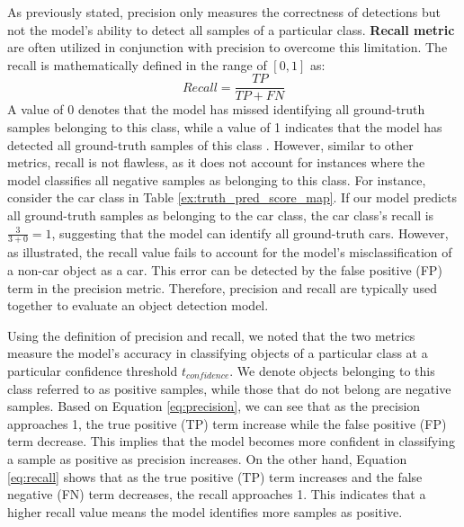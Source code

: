 As previously stated, precision only measures the correctness of detections but not the model's ability to detect all samples of a particular class. \textbf{Recall metric} are often utilized in conjunction with precision to overcome this limitation. The recall is mathematically defined in the range of $[0,1]$ as:
\begin{equation}
    Recall = \frac{TP}{TP+FN} \label{eq:recall}
\end{equation}
A value of 0 denotes that the model has missed identifying all ground-truth samples belonging to this class, while a value of 1 indicates that the model has detected all ground-truth samples of this class \cite{metrics_survey_2020}. However, similar to other metrics, recall is not flawless, as it does not account for instances where the model classifies all negative samples as belonging to this class. For instance, consider the car class in Table \ref{ex:truth_pred_score_map}. If our model predicts all ground-truth samples as belonging to the car class, the car class's recall is $\frac{3}{3+0}=1$, suggesting that the model can identify all ground-truth cars. However, as illustrated, the recall value fails to account for the model's misclassification of a non-car object as a car. This error can be detected by the false positive (FP) term in the precision metric. Therefore, precision and recall are typically used together to evaluate an object detection model.

Using the definition of precision and recall, we noted that the two metrics measure the model's accuracy in classifying objects of a particular class at a particular confidence threshold $t_{confidence}$. We denote objects belonging to this class referred to as positive samples, while those that do not belong are negative samples. Based on Equation \ref{eq:precision}, we can see that as the precision approaches 1, the true positive (TP) term increase while the false positive (FP) term decrease. This implies that the model becomes more confident in classifying a sample as positive as precision increases. On the other hand, Equation \ref{eq:recall} shows that as the true positive (TP) term increases and the false negative (FN) term decreases, the recall approaches 1. This indicates that a higher recall value means the model identifies more samples as positive. 

